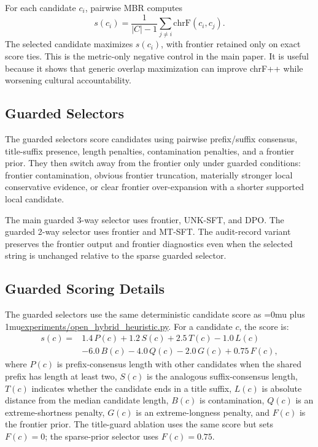 \documentclass{article}
\newcommand{\pathcode}[1]{{\begingroup\Urlmuskip=0mu plus 1mu\url{#1}\endgroup}}
\begin{document}
For each candidate $c_i$, pairwise MBR computes
\[
  s(c_i)=\frac{1}{|C|-1}\sum_{j \ne i}\mathrm{chrF}(c_i,c_j).
\]
The selected candidate maximizes $s(c_i)$, with frontier retained only on exact score ties. This is the metric-only negative control in the main paper. It is useful because it shows that generic overlap maximization can improve chrF++ while worsening cultural accountability.

\subsection{Guarded Selectors}

The guarded selectors score candidates using pairwise prefix/suffix consensus, title-suffix presence, length penalties, contamination penalties, and a frontier prior. They then switch away from the frontier only under guarded conditions: frontier contamination, obvious frontier truncation, materially stronger local conservative evidence, or clear frontier over-expansion with a shorter supported local candidate.

The main guarded 3-way selector uses frontier, UNK-SFT, and DPO. The guarded 2-way selector uses frontier and MT-SFT. The audit-record variant preserves the frontier output and frontier diagnostics even when the selected string is unchanged relative to the sparse guarded selector.

\subsection{Guarded Scoring Details}

The guarded selectors use the same deterministic candidate score as \pathcode{experiments/open_hybrid_heuristic.py}. For a candidate \(c\), the score is:
\[
\begin{split}
s(c) = &1.4\,P(c) + 1.2\,S(c) + 2.5\,T(c) - 1.0\,L(c)\\
&-6.0\,B(c)-4.0\,Q(c)-2.0\,G(c)+0.75\,F(c),
\end{split}
\]
where \(P(c)\) is prefix-consensus length with other candidates when the shared prefix has length at least two, \(S(c)\) is the analogous suffix-consensus length, \(T(c)\) indicates whether the candidate ends in a title suffix, \(L(c)\) is absolute distance from the median candidate length, \(B(c)\) is contamination, \(Q(c)\) is an extreme-shortness penalty, \(G(c)\) is an extreme-longness penalty, and \(F(c)\) is the frontier prior. The title-guard ablation uses the same score but sets \(F(c)=0\); the sparse-prior selector uses \(F(c)=0.75\).
\end{document}
